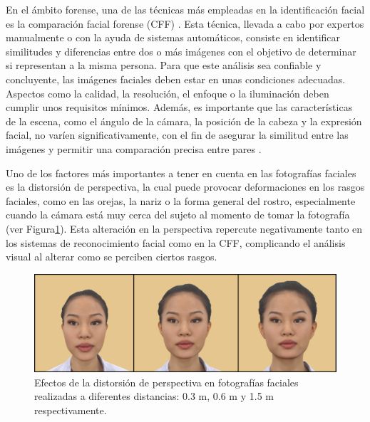 En el ámbito forense, una de las técnicas más empleadas en la identificación facial es la comparación facial forense (CFF) \cite{3}. Esta técnica, llevada a cabo por expertos manualmente o con la ayuda de sistemas automáticos, consiste en identificar similitudes y diferencias entre dos o más imágenes con el objetivo de determinar si representan a la misma persona. 
Para que este análisis sea confiable y concluyente, las imágenes faciales deben estar en unas condiciones adecuadas. Aspectos como la calidad, la resolución, el enfoque o la iluminación deben cumplir unos requisitos mínimos. Además, es importante que las características de la escena, como el ángulo de la cámara, la posición de la cabeza y la expresión facial, no varíen significativamente, con el fin de asegurar la similitud entre las imágenes y permitir una comparación precisa entre pares \cite{1,2}. %


Uno de los factores más importantes a tener en cuenta en las fotografías faciales es la distorsión de perspectiva, la cual puede provocar deformaciones en los rasgos faciales, como en las orejas, la nariz o la forma general del rostro, especialmente cuando la cámara está muy cerca del sujeto al momento de tomar la fotografía~\cite{12} (ver Figura\ref{fig1.1.1}). 
Esta alteración en la perspectiva repercute negativamente tanto en los sistemas de reconocimiento facial como en la CFF, complicando el análisis visual al alterar como se perciben ciertos rasgos. %

\begin{figure}[h]
	\centering
	\includegraphics[scale=0.25]{imagenes/cap1/scd_distorsion3.png}
	\caption{Efectos de la distorsión de perspectiva en fotografías faciales realizadas a diferentes distancias: 0.3 m, 0.6 m y 1.5 m respectivamente.}
	\label{fig1.1.1}
\end{figure}

